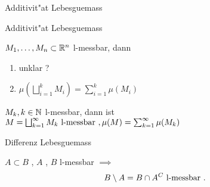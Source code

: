 \documentclass[class=article, crop=false]{standalone}
\begin{document}
\begin{zettel}{Additivit"at Lebesguemass}
\begin{flashcard}[optb78jp]{Additivit"at Lebesguemass}
	\begin{lemma}
		$ M_1,\dots,M_n \subset \mathbb{R}^n$ l-messbar, dann
		\begin{enumerate}
			\item unklar ?
			\item $ \mu (\bigsqcup_{i = 1}^k M_i) = \sum_{i=1}^{k} \mu(M_i)$
		\end{enumerate}

		$M_k , k \in \mathbb{N} $ l-messbar, dann ist\\
		$
			M = \bigsqcup_{k = 1 }^{\infty} M_k \text{ l-messbar } , \mu(M) = \sum_{k = 1}^{\infty} \mu(M_k)
		$
	\end{lemma}
\end{flashcard}

\begin{flashcard}[nu3n7eh5]{Differenz Lebesguemass}
	\begin{lemma}
		$A \subset  B$ , $A$ , $B$ l-messbar $\implies$
		\[
			B \setminus A = B \cap  A^C \text{ l-messbar }
		.\]
	\end{lemma}
\end{flashcard}

\end{zettel}
\end{document}
